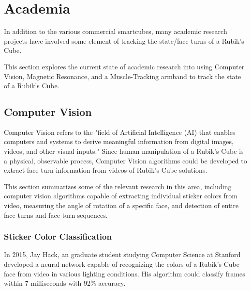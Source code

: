 \section{Academia}
In addition to the various commercial smartcubes, many academic research projects have involved some element of tracking the state/face turns of a Rubik's Cube.

This section explores the current state of academic research into using Computer Vision, Magnetic Resonance, and a Muscle-Tracking armband to track the state of a Rubik's Cube.


\subsection{Computer Vision}
\label{subsec:computer-vision}
Computer Vision refers to the "field of Artificial Intelligence (AI) that enables computers and systems to derive meaningful information from digital images, videos, and other visual inputs." \cite{ibm-cv-definition}
Since human manipulation of a Rubik's Cube is a physical, observable process, Computer Vision algorithms could be developed to extract face turn information from videos of Rubik's Cube solutions.

This section summarizes some of the relevant research in this area, including computer vision algorithms capable of extracting individual sticker colors from video, measuring the angle of rotation of a specific face, and detection of entire face turns and face turn sequences.

\subsubsection{Sticker Color Classification}
In 2015, Jay Hack, an graduate student studying Computer Science at Stanford developed a neural network capable of recognizing the colors of a Rubik's Cube face from video in various lighting conditions.
His algorithm could classify frames within 7 milliseconds with 92\% accuracy. \cite{hackrubik}

